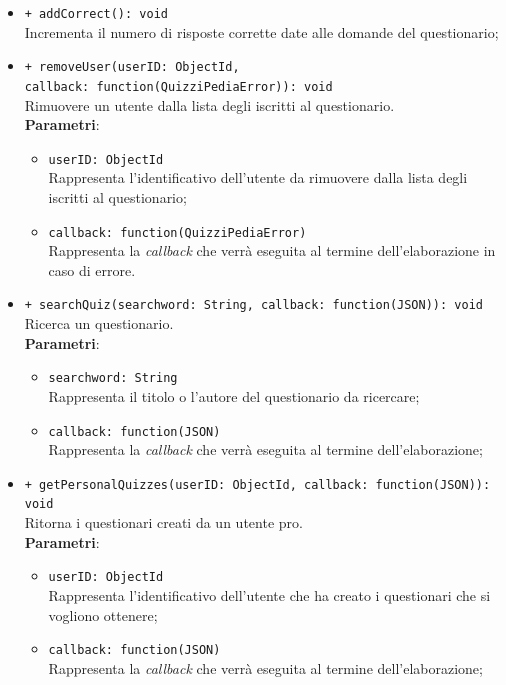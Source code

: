 \begin{itemize}
\begin{itemize}
			\item \texttt{+ addCorrect(): void}\\
			Incrementa il numero di risposte corrette date alle domande del questionario;		
			
			\item \texttt{+ removeUser(userID: ObjectId, \\callback: function(QuizziPediaError)): void}\\
			Rimuovere un utente dalla lista degli iscritti al questionario.\\
			\textbf{Parametri}:
			\begin{itemize}
				\item \texttt{userID: ObjectId}\\
				Rappresenta l'identificativo dell'utente da rimuovere dalla lista degli iscritti al questionario;
				\item \texttt{callback: function(QuizziPediaError)}\\
				Rappresenta la \textit{callback} che verrà eseguita al termine dell'elaborazione in caso di errore.
			\end{itemize}
			
			\item \texttt{+ searchQuiz(searchword: String, callback: function(JSON)): void}\\
			Ricerca un questionario.\\
			\textbf{Parametri}:
			\begin{itemize}
				\item \texttt{searchword: String}\\
				Rappresenta il titolo o l'autore del questionario da ricercare;
				\item \texttt{callback: function(JSON)}\\
				Rappresenta la \textit{callback} che verrà eseguita al termine dell'elaborazione;
			\end{itemize}
			
			\item \texttt{+ getPersonalQuizzes(userID: ObjectId, callback: function(JSON)): void}\\
			Ritorna i questionari creati da un utente pro.\\
			\textbf{Parametri}:
			\begin{itemize}
				\item \texttt{userID: ObjectId}\\
				Rappresenta l'identificativo dell'utente che ha creato i questionari che si vogliono ottenere;
				\item \texttt{callback: function(JSON)}\\
				Rappresenta la \textit{callback} che verrà eseguita al termine dell'elaborazione;
			\end{itemize}
			

\end{itemize}
\end{itemize}
